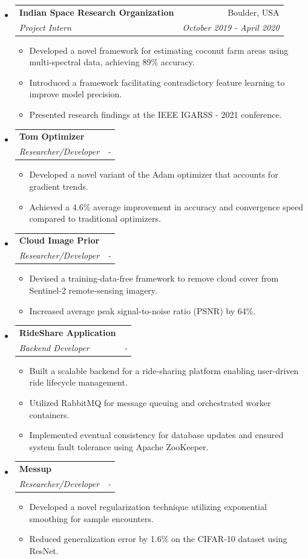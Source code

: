 \documentclass[letterpaper,11pt]{article}
\makeatletter
\newlength{\outerbordwidth}
\newcommand{\resitem}[1]{\item #1 \vspace{-2pt}}
\newcommand{\resheading}[1]{\vspace{6pt}
    \parbox{\textwidth}{\setlength{\FrameSep}{\outerbordwidth}
        \begin{shaded}
    \setlength{\fboxsep}{0pt}\framebox[\textwidth][l]{\setlength{\fboxsep}{2pt}\fcolorbox{shadecolorB}{shadecolorB}{\textbf{\sffamily{\mbox{~}\makebox[6.8in][l]{\large #1} \vphantom{p\^{E}}}}}}
        \end{shaded}
    }\vspace{-6pt}
    }
\newcommand{\ressubheading}[4]{
    \begin{tabular*}{6.5in}{p{4.8in}@{\extracolsep{\fill}}r}
            \textbf{#1} & #2 \\
            \textit{#3} & \textit{#4} \\
    \end{tabular*}\vspace{-8pt}}
\makeatother
\begin{document}
\begin{itemize}
\begin{itemize}
            \resitem{Facilitated rapid response to the Log4j vulnerability by streamlining dependency management processes.}
            \resitem{Designed and automated robust test cases for the Commvault Cloud Disaster Recovery solution to ensure high availability.}
        \end{itemize}
        \item \ressubheading{Indian Space Research Organization}{Boulder, USA}{Project Intern}{October 2019 - April 2020}
        \begin{itemize}
            \resitem{Developed a novel framework for estimating coconut farm areas using multi-spectral data, achieving 89\% accuracy.}
            \resitem{Introduced a framework facilitating contradictory feature learning to improve model precision.}
            \resitem{Presented research findings at the IEEE IGARSS - 2021 conference.}
        \end{itemize}
      \end{itemize}
      \resheading{Projects}
      \begin{itemize}
        \item \ressubheading{Tom Optimizer}{}{Researcher/Developer}{ - }
        \begin{itemize}
            \resitem{Developed a novel variant of the Adam optimizer that accounts for gradient trends.}
            \resitem{Achieved a 4.6\% average improvement in accuracy and convergence speed compared to traditional optimizers.}
        \end{itemize}
        \item \ressubheading{Cloud Image Prior}{}{Researcher/Developer}{ - }
        \begin{itemize}
            \resitem{Devised a training-data-free framework to remove cloud cover from Sentinel-2 remote-sensing imagery.}
            \resitem{Increased average peak signal-to-noise ratio (PSNR) by 64\%.}
        \end{itemize}
        \item \ressubheading{RideShare Application}{}{Backend Developer}{ - }
        \begin{itemize}
            \resitem{Built a scalable backend for a ride-sharing platform enabling user-driven ride lifecycle management.}
            \resitem{Utilized RabbitMQ for message queuing and orchestrated worker containers.}
            \resitem{Implemented eventual consistency for database updates and ensured system fault tolerance using Apache ZooKeeper.}
        \end{itemize}
        \item \ressubheading{Messup}{}{Researcher/Developer}{ - }
        \begin{itemize}
            \resitem{Developed a novel regularization technique utilizing exponential smoothing for sample encounters.}
            \resitem{Reduced generalization error by 1.6\% on the CIFAR-10 dataset using ResNet.}
        \end{itemize}
      \end{itemize}
\end{document}
